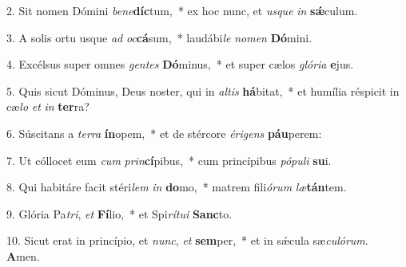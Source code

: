 2. Sit nomen Dómini \textit{be}\textit{ne}\textbf{díc}tum,~*  ex hoc nunc, et \textit{us}\textit{que} \textit{in} \textbf{sǽ}culum.\

3. A solis ortu usque \textit{ad} \textit{oc}\textbf{cá}sum,~*  laudábi\textit{le} \textit{no}\textit{men} \textbf{Dó}mini.\

4. Excélsus super omnes \textit{gen}\textit{tes} \textbf{Dó}minus,~*  et super cælos \textit{gló}\textit{ri}\textit{a} \textbf{e}jus.\

5. Quis sicut Dóminus, Deus noster, qui in \textit{al}\textit{tis} \textbf{há}bitat,~*  et humília réspicit in cæ\textit{lo} \textit{et} \textit{in} \textbf{ter}ra?\

6. Súscitans a \textit{ter}\textit{ra} \textbf{ín}opem,~*  et de stércore \textit{é}\textit{ri}\textit{gens} \textbf{páu}perem:\

7. Ut cóllocet eum \textit{cum} \textit{prin}\textbf{cí}pibus,~*  cum princípibus \textit{pó}\textit{pu}\textit{li} \textbf{su}i.\

8. Qui habitáre facit stéri\textit{lem} \textit{in} \textbf{do}mo,~*  matrem fili\textit{ó}\textit{rum} \textit{læ}\textbf{tán}tem.\

9. Glória Pa\textit{tri}, \textit{et} \textbf{Fí}lio,~*  et Spi\textit{rí}\textit{tu}\textit{i} \textbf{Sanc}to.\

10. Sicut erat in princípio, et \textit{nunc}, \textit{et} \textbf{sem}per,~*  et in sǽcula sæ\textit{cu}\textit{ló}\textit{rum}. \textbf{A}men.\


